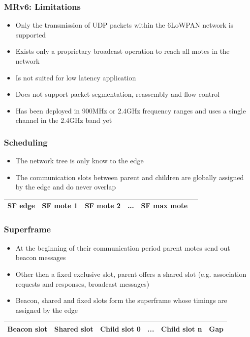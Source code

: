 \begin{frame}[fragile]
  \frametitle{MRv6: Limitations}
  \begin{itemize}
    \item Only the transmission of UDP packets within the 6LoWPAN network is supported
    \item Exists only a proprietary broadcast operation to reach all motes in the network
    \item Is not suited for low latency application
    \item Does not support packet segmentation, reassembly and flow control
    \item Has been deployed in 900MHz or 2.4GHz frequency ranges and uses a single channel in the 2.4GHz band yet
  \end{itemize}
\end{frame}

\begin{frame}[fragile]
  \frametitle{Scheduling}
  \begin{itemize}
    \item The network tree is only know to the edge
    \item The communication slots between parent and children are globally assigned by the edge and do never overlap
    \end{itemize}
    \begin{table}[h]
      \begin{tabular}{@{}|c|c|l|l|l|l|@{}}
	\toprule
	 SF edge & SF mote 1 & SF mote 2 & ... & SF max mote \\ \bottomrule
      \end{tabular}
    \end{table}
\end{frame}

\begin{frame}[fragile]
  \frametitle{Superframe}
  \begin{itemize}
   \item At the beginning of their communication period parent motes send out beacon messages
    \item Other then a fixed exclusive slot, parent offers a shared slot (e.g. association requests and responses, broadcast messages)
    \item Beacon, shared and fixed slots form the superframe whose timings are assigned by the edge
  \end{itemize}
  \begin{table}[h]
    \begin{tabular}{@{}|p{1.5cm}|p{1.5cm}|p{1.5cm}|p{1cm}|p{1.5cm}|p{1cm}|@{}}
      \toprule
      Beacon slot & Shared slot & Child slot 0 & ... & Child slot n & Gap \\ \bottomrule
    \end{tabular}
  \end{table}
\end{frame}

